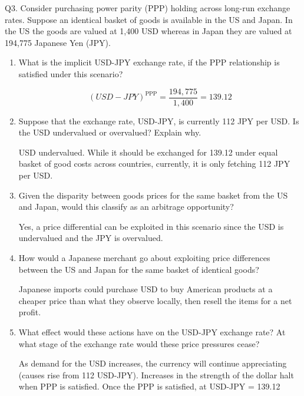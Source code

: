 \documentclass[12pt]{article}
\begin{document}
\noindent Q3. Consider purchasing power parity (PPP) holding across long-run exchange rates.
Suppose an identical basket of goods is available in the US and Japan. In the US the goods are valued at 1,400 USD whereas in Japan they are valued at 194,775 Japanese Yen (JPY).

\begin{enumerate}[1)]
	\item What is the implicit USD-JPY exchange rate, if the PPP relationship is satisfied under this scenario?
	
	$$\left(USD-JPY\right)^{\text{PPP}} = \frac{194,775}{1,400} = 139.12$$
	
		\newpage
	
	\item Suppose that the exchange rate, USD-JPY, is currently 112 JPY per USD. Is the USD undervalued or overvalued? Explain why.
	
	\vspace{0.2in}
	USD undervalued. While it should be exchanged for 139.12 under equal basket of good costs across countries, currently, it is only fetching 112 JPY per USD.
	\vspace{0.2in}
	

	
	\item Given the disparity between goods prices for the same basket from the US and Japan, would this classify as an arbitrage opportunity?  
	
	\vspace{0.2in}
	Yes, a price differential can be exploited in this scenario since the USD is undervalued and the JPY is overvalued.
	\vspace{0.2in}
	
	\item How would a Japanese merchant go about exploiting price differences between the US and Japan for the same basket of identical goods?
	
	\vspace{0.2in}
	Japanese imports could purchase USD to buy American products at a cheaper price than what they observe locally, then resell the items for a net profit.
	\vspace{0.2in}
	
	
	\item What effect would these actions have on the USD-JPY exchange rate? At what stage of the exchange rate would these price pressures cease?
	
	\vspace{0.2in}
	As demand for the USD increases, the currency will continue appreciating (causes rise from 112 USD-JPY).
	Increases in the strength of the dollar halt when PPP is satisfied.
	Once the PPP is satisfied, at USD-JPY = 139.12
	\vspace{0.2in}
	
\end{enumerate}
\end{document}
